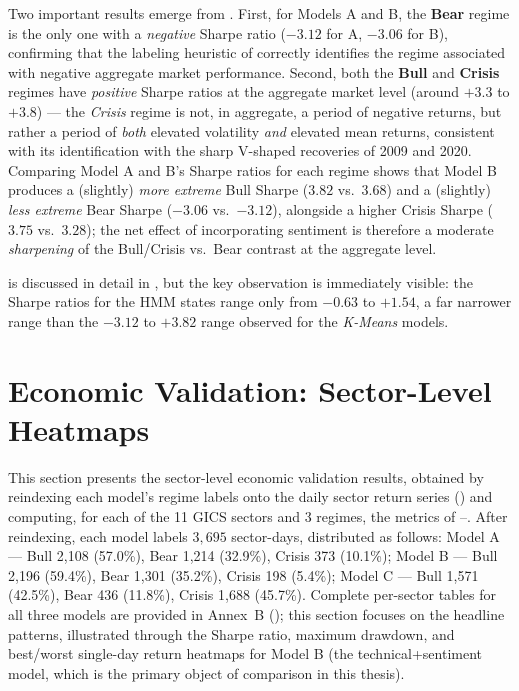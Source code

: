 Two important results emerge from . First, for
Models A and B, the \textbf{Bear} regime is the only one with a
\emph{negative} Sharpe ratio ($-3.12$ for A, $-3.06$ for B), confirming
that the labeling heuristic of  correctly
identifies the regime associated with negative aggregate market
performance. Second, both the \textbf{Bull} and \textbf{Crisis} regimes
have \emph{positive} Sharpe ratios at the aggregate market level (around
$+3.3$ to $+3.8$) --- the \emph{Crisis} regime is not, in aggregate, a
period of negative returns, but rather a period of \emph{both} elevated
volatility \emph{and} elevated mean returns, consistent with its
identification with the sharp V-shaped recoveries of 2009 and 2020.
Comparing Model A and B's Sharpe ratios for each regime shows that Model B
produces a (slightly) \emph{more extreme} Bull Sharpe ($3.82$ vs.\ $3.68$)
and a (slightly) \emph{less extreme} Bear Sharpe ($-3.06$ vs.\ $-3.12$),
alongside a higher Crisis Sharpe ($3.75$ vs.\ $3.28$); the net effect of
incorporating sentiment is therefore a moderate \emph{sharpening} of the
Bull/Crisis vs.\ Bear contrast at the aggregate level.

 is discussed in detail in , but
the key observation is immediately visible: the Sharpe ratios for the HMM
states range only from $-0.63$ to $+1.54$, a far narrower range than the
$-3.12$ to $+3.82$ range observed for the \textit{K-Means} models.

\section{Economic Validation: Sector-Level Heatmaps}
\label{sec:results-econ-sector}

This section presents the sector-level economic validation results,
obtained by reindexing each model's regime labels onto the daily sector
return series () and computing, for each of the
11 GICS sectors and 3 regimes, the metrics of
--. After reindexing, each model labels
$3{,}695$ sector-days, distributed as follows: Model A --- Bull 2{,}108
(57.0\%), Bear 1{,}214 (32.9\%), Crisis 373 (10.1\%); Model B --- Bull
2{,}196 (59.4\%), Bear 1{,}301 (35.2\%), Crisis 198 (5.4\%); Model C ---
Bull 1{,}571 (42.5\%), Bear 436 (11.8\%), Crisis 1{,}688 (45.7\%). Complete
per-sector tables for all three models are provided in Annex~B
(); this
section focuses on the headline patterns, illustrated through the Sharpe
ratio, maximum drawdown, and best/worst single-day return heatmaps for
Model B (the technical+sentiment model, which is the primary object of
comparison in this thesis).

